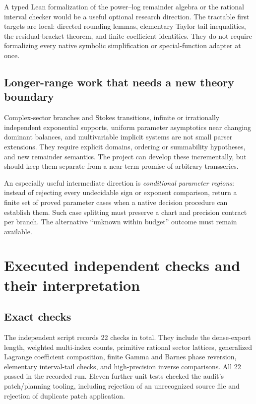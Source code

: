 \documentclass[11pt,a4paper]{article}
\theoremstyle{definition}
\begin{document}
A typed Lean formalization of the power--log remainder algebra or the rational interval checker would be a useful optional research direction. The tractable first targets are local: directed rounding lemmas, elementary Taylor tail inequalities, the residual-bracket theorem, and finite coefficient identities. They do not require formalizing every native symbolic simplification or special-function adapter at once.

\subsection{Longer-range work that needs a new theory boundary}

Complex-sector branches and Stokes transitions, infinite or irrationally independent exponential supports, uniform parameter asymptotics near changing dominant balances, and multivariable implicit systems are not small parser extensions. They require explicit domains, ordering or summability hypotheses, and new remainder semantics. The project can develop these incrementally, but should keep them separate from a near-term promise of arbitrary transseries.

An especially useful intermediate direction is \emph{conditional parameter regions}: instead of rejecting every undecidable sign or exponent comparison, return a finite set of proved parameter cases when a native decision procedure can establish them. Such case splitting must preserve a chart and precision contract per branch. The alternative ``unknown within budget'' outcome must remain available.

\section{Executed independent checks and their interpretation}
\label{sec:executed}

\subsection{Exact checks}

The independent script records 22 checks in total. They include the dense-export length, weighted multi-index counts, primitive rational sector lattices, generalized Lagrange coefficient composition, finite Gamma and Barnes phase reversion, elementary interval-tail checks, and high-precision inverse comparisons. All 22 passed in the recorded run. Eleven further unit tests checked the audit's patch/planning tooling, including rejection of an unrecognized source file and rejection of duplicate patch application.
\end{document}
